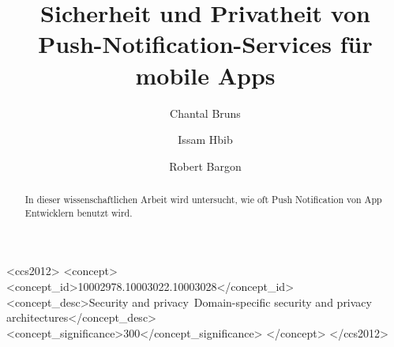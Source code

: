 \documentclass[sigconf]{acmart}
\begin{document}
\title{Sicherheit und Privatheit von Push-Notification-Services für mobile Apps}

\author{Chantal Bruns}

\author{Issam Hbib}

\author{Robert Bargon}

\renewcommand{\shortauthors}{Bruns, Hbib, Bargon}

\begin{abstract}
  In dieser wissenschaftlichen Arbeit wird untersucht, wie oft Push Notification von App Entwicklern benutzt wird.
\end{abstract}

\begin{CCSXML}
<ccs2012>
  <concept>
  <concept_id>10002978.10003022.10003028</concept_id>
  <concept_desc>Security and privacy~Domain-specific security and privacy architectures</concept_desc>
  <concept_significance>300</concept_significance>
  </concept>
</ccs2012>
\end{CCSXML}


\end{document}
